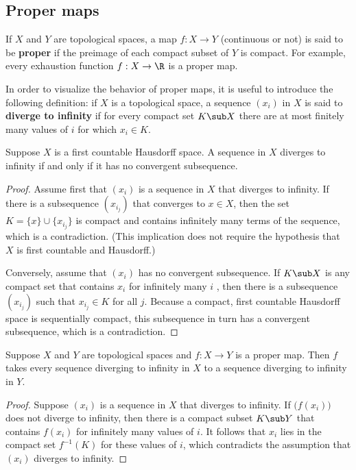 \subsection{Proper maps}
If $X$ and $Y$ are topological spaces, a map $f:X\to Y$ (continuous or not) is said to be \textbf{proper} if the preimage of each compact subset of $Y$ is compact. For example, every exhaustion function $f:X\to\R$ is a proper map.\par
In order to visualize the behavior of proper maps, it is useful to introduce the following definition: if $X$ is a topological space, a sequence $(x_i)$ in $X$ is said to \textbf{diverge to infinity} if for every compact set $K\sub X$ there are at most finitely many values of $i$ for which $x_i\in K$.
\begin{lemma}\label{topo space diverge to inf iff no convergent subseq}
Suppose $X$ is a first countable Hausdorff space. A sequence in $X$ diverges to infinity if and only if it has no convergent subsequence.
\end{lemma}
\begin{proof}
Assume first that $(x_i)$ is a sequence in $X$ that diverges to infinity. If there is a subsequence $(x_{i_j})$ that converges to $x\in X$, then the set $K=\{x\}\cup\{x_{i_j}\}$ is compact and contains infinitely many terms of the sequence, which is a contradiction. (This implication does not require the hypothesis that $X$ is first countable and Hausdorff.)\par
Conversely, assume that $(x_i)$ has no convergent subsequence. If $K\sub X$ is any compact set that contains $x_i$ for infinitely many $i$ , then there is a subsequence $(x_{i_j})$ such that $x_{i_j}\in K$ for all $j$. Because a compact, first countable Hausdorff space is sequentially compact, this subsequence in turn has a convergent subsequence, which is a contradiction.
\end{proof}
\begin{proposition}
Suppose $X$ and $Y$ are topological spaces and $f:X\to Y$ is a proper map. Then $f$ takes every sequence diverging to infinity in $X$ to a sequence diverging to infinity in $Y$.
\end{proposition}
\begin{proof}
Suppose $(x_i)$ is a sequence in $X$ that diverges to infinity. If $\big(f(x_i)\big)$ does not diverge to infinity, then there is a compact subset $K\sub Y$ that contains $f(x_i)$ for infinitely many values of $i$. It follows that $x_i$ lies in the compact set $f^{-1}(K)$ for these values of $i$, which contradicts the assumption that $(x_i)$ diverges to infinity.
\end{proof}
